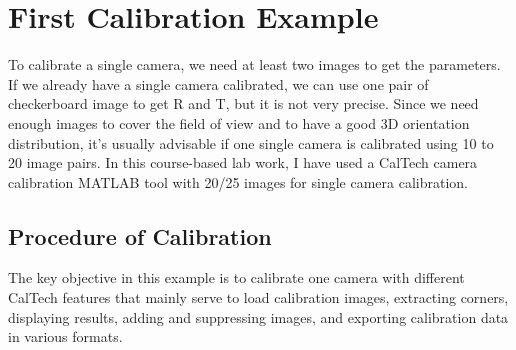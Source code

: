 \documentclass[a4paper, 12pt]{report}
\begin{document}
  \section{First Calibration Example}
To calibrate a single camera, we need at least two images to get the parameters. If we already have a single camera calibrated, we can use one pair of checkerboard image to get R and T, but it is not very precise. Since we need enough images to cover the field of view and to have a good 3D orientation distribution, it’s usually advisable if one single camera is calibrated using 10 to 20 image pairs. In this course-based lab work, I have used a CalTech camera calibration MATLAB tool with 20/25 images for single camera calibration.
   \subsection{Procedure of Calibration}
The key objective in this example is to calibrate one camera with different CalTech features that mainly serve to load calibration images, extracting corners, displaying results, adding and suppressing images, and exporting calibration data in various formats. 
\end{document}
